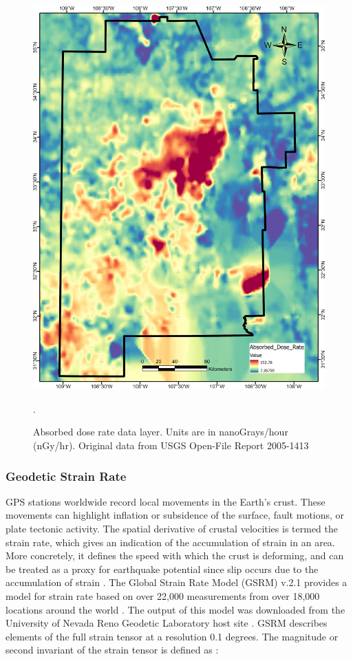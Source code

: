 \begin{figure}[!htp]
\centering
\includegraphics[scale=.50]{templates/images/Figure-AbsorbedDoseRate.png}
\caption[Absorbed dose rate data layer]{Absorbed dose rate data layer. Units are in nanoGrays/hour (nGy/hr). Original data from USGS Open-File Report 2005-1413 \protect\citep{duval_terrestrial_2005}}.
\label{fig:feat_gamma}
\end{figure}

\subsubsection{Geodetic Strain Rate}

GPS stations worldwide record local movements in the Earth’s crust. These movements can highlight inflation or subsidence of the surface, fault motions, or plate tectonic activity. The spatial derivative of crustal velocities is termed the strain rate, which gives an indication of the accumulation of strain in an area. More concretely, it defines the speed with which the crust is deforming, and can be treated as a proxy for earthquake potential since slip occurs due to the accumulation of strain \citep{gem_strain_2014}. The Global Strain Rate Model (GSRM) v.2.1 provides a model for strain rate based on over 22,000 measurements from over 18,000 locations around the world \citep{kreemer_geodetic_2014}. The output of this model was downloaded from the University of Nevada Reno Geodetic Laboratory host site \citep{kreemer_corne_global_2020}. GSRM describes elements of the full strain tensor at a resolution 0.1 degrees. The magnitude or second invariant of the strain tensor is defined as \citep{kreemer_geodetic_2014}:


